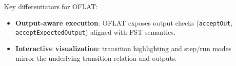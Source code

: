 Key differentiators for OFLAT:
\begin{itemize}
  \item \textbf{Output-aware execution}: OFLAT exposes output checks (\texttt{acceptOut}, \texttt{acceptExpectedOutput}) 
  aligned with FST semantics.
  \item \textbf{Interactive visualization}: transition highlighting and step/run modes mirror the underlying transition relation and outputs.
\end{itemize}


